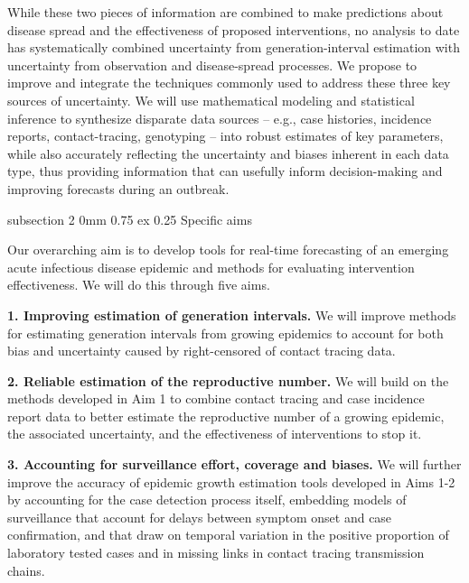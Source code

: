 \documentclass[12pt]{article}
\makeatletter
\renewcommand{\subsection}%
{\vspace{0.0ex \@plus 3.0ex \@minus 1.0ex}\@startsection  %
{subsection}%
{2}%
{0mm}%
{0.75\baselineskip \@plus 0.25 ex}%
{0.25\baselineskip}%
{\normalfont\large\bfseries}}%
\makeatother
\begin{document}
While these two pieces of information are combined to make predictions about disease spread and the effectiveness of proposed interventions, no analysis to date has systematically combined uncertainty from generation-interval estimation with uncertainty from observation and disease-spread processes. We propose to improve and integrate the techniques commonly used to address these three key sources of uncertainty. We will use mathematical modeling and statistical inference to synthesize disparate data sources -- e.g., case histories, incidence reports, contact-tracing, genotyping -- into robust estimates of key parameters, while also accurately reflecting the uncertainty and biases inherent in each data type, thus providing information that can usefully inform decision-making and improving forecasts during an outbreak.

\subsection{Specific aims}

Our overarching aim is to develop tools for real-time forecasting of an emerging acute infectious disease epidemic and methods for evaluating intervention effectiveness. We will do this through five aims.

\begin{hangparas}{.25in}{1}\textbf{1. Improving estimation of generation intervals.} We will improve methods for estimating generation intervals from growing epidemics to account for both bias and uncertainty caused by right-censored of contact tracing data. \end{hangparas}

\begin{hangparas}{.25in}{1}\textbf{2. Reliable estimation of the reproductive number.} We will build on the methods developed in Aim 1 to combine contact tracing and case incidence report data to better estimate the reproductive number of a growing epidemic, the associated uncertainty, and the effectiveness of interventions to stop it. \end{hangparas}

\begin{hangparas}{.25in}{1}\textbf{3. Accounting for surveillance effort, coverage and biases.} We will further improve the accuracy of epidemic growth estimation tools developed in Aims 1-2 by accounting for the case detection process itself, embedding models of surveillance that account for delays between symptom onset and case confirmation, and that draw on temporal variation in the positive proportion of laboratory tested cases and in missing links in contact tracing transmission chains. \end{hangparas}
\end{document}

